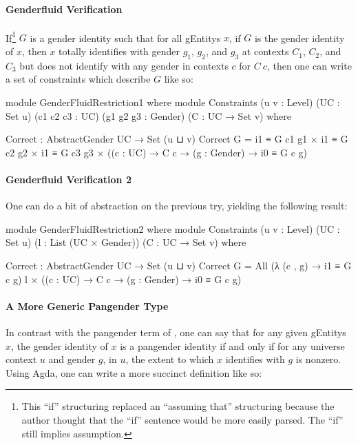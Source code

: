 \documentclass{article}
\theoremstyle{remark}
\begin{document}
\paragraph{Genderfluid Verification}
If\footnote{This ``if'' structuring replaced an ``assuming that'' structuring because the author thought that the ``if'' sentence would be more easily parsed.  The ``if'' still implies assumption.} \(G\) is a gender identity such that for all \glspl{gEntity} \(x\), if \(G\) is the gender identity of \(x\), then \(x\) totally identifies with gender \(g_1\), \(g_2\), and \(g_3\) at contexts \(C_1\), \(C_2\), and \(C_3\) but does not identify with any gender in contexts \(c\) for \(C\ c\), then one can write a set of constraints which describe \(G\) like so:

\begin{code}
    module GenderFluidRestriction1 where
      module Constraints
             (u v : Level)
             (UC : Set u)
             (c1 c2 c3 : UC)
             (g1 g2 g3 : Gender)
             (C : UC → Set v) where

        Correct : AbstractGender UC → Set (u ⊔ v)
        Correct G = i1 ≡ G c1 g1
                  × i1 ≡ G c2 g2
                  × i1 ≡ G c3 g3
                  × ((c : UC) → C c → (g : Gender) → i0 ≡ G c g)
\end{code}

\paragraph{Genderfluid Verification 2}
One can do a bit of abstraction on the previous try, yielding the following result:

\begin{code}
    module GenderFluidRestriction2 where
      module Constraints
             (u v : Level)
             (UC : Set u)
             (l : List (UC × Gender))
             (C : UC → Set v) where

        Correct : AbstractGender UC → Set (u ⊔ v)
        Correct G = All (λ (c , g) → i1 ≡ G c g) l
                  × ((c : UC) → C c → (g : Gender) → i0 ≡ G c g)
\end{code}

\paragraph{A More Generic Pangender Type}
In contrast with the pangender term of , one can say that for any given \glspl{gEntity} \(x\), the gender identity of \(x\) is a pangender identity if and only if for any universe context \(u\) and gender \(g\), in \(u\), the extent to which \(x\) identifies with \(g\) is nonzero.  Using Agda, one can write a more succinct definition like so:
\end{document}
